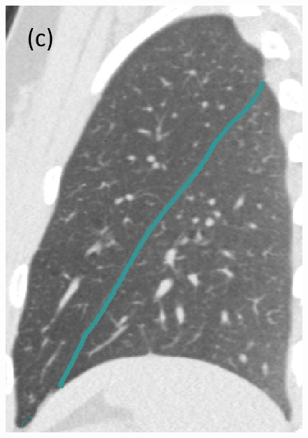 \documentclass[]{spie}  %
\begin{document}
{\begin{figure}[htbp]
\begin{subfigure}
{\begin{minipage}[t]{0.15\linewidth}
  \includegraphics[width=\linewidth,trim={{.0\wd0} {.0\wd0} {.0\wd0} {.0\wd0}},clip]{Image/H1335_FRC_PCAFissureDetection_Sagittal.png}
  \centerline{}
	\end{minipage}%
   }%
  \label{fig:HLASegmentationResults-c} 
\end{subfigure}
\hspace{2.8in}
\vspace{.1in}
\begin{subfigure}{
 \begin{minipage}[t]{0.2\linewidth}

\end{minipage}}
\end{subfigure}
\end{figure}}
\end{document}
